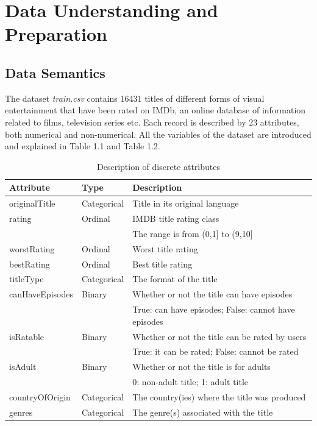 \chapter{Data Understanding and Preparation}
\label{ch:capitolo1}

\section{Data Semantics}\label{sec:data_semantics}
The dataset \textit{train.csv} contains 16431 titles of different forms of visual entertainment that have been rated on IMDb, 
an online database of information related to films, television series etc. 
Each record is described by 23 attributes, both numerical and non-numerical. 
All the variables of the dataset are introduced and explained in Table 1.1 and Table 1.2.
\begin{table}[h]
    \centering
    \begin{tabular}{|l|l|l|} %
        \hline
        \textbf{Attribute} & \textbf{Type} & \textbf{Description} \\ 
        \hline
        originalTitle & Categorical & Title in its original language \\  
        \hline
        rating & Ordinal & IMDB title rating class \\
        & & The range is from (0,1] to (9,10] \\ 
        \hline
        worstRating & Ordinal & Worst title rating \\ 
        \hline
        bestRating & Ordinal & Best title rating \\ 
        \hline
        titleType & Categorical & The format of the title \\ 
        \hline
        canHaveEpisodes & Binary & Whether or not the title can have episodes \\ 
        & & True: can have episodes; False: cannot have episodes \\ 
        \hline
        isRatable & Binary & Whether or not the title can be rated by users \\ 
        & & True: it can be rated; False: cannot be rated \\ 
        \hline
        isAdult & Binary & Whether or not the title is for adults \\ 
        & & 0: non-adult title; 1: adult title \\ 
        \hline
        countryOfOrigin & Categorical & The country(ies) where the title was produced \\ 
        \hline
        genres & Categorical & The genre(s) associated with the title \\ 
        \hline
    \end{tabular}
    \caption{Description of discrete attributes}
    \label{tab:attributes}
\end{table}
